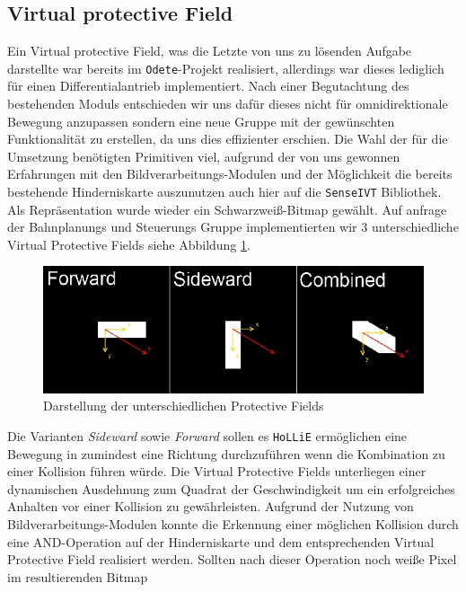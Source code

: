 \subsection{Virtual protective Field}
\label{sec:vpf}
Ein Virtual protective Field, was die Letzte von uns zu lösenden Aufgabe darstellte war bereits im \lstinline{Odete}-Projekt
 realisiert, allerdings war dieses lediglich für einen Differentialantrieb implementiert.
 Nach einer Begutachtung des bestehenden Moduls entschieden wir uns dafür
 dieses nicht für omnidirektionale Bewegung anzupassen sondern eine neue Gruppe mit der gewünschten Funktionalität
 zu erstellen, da uns dies effizienter erschien. Die Wahl der für die Umsetzung benötigten Primitiven viel, aufgrund
 der von uns gewonnen Erfahrungen mit den Bildverarbeitungs-Modulen und der Möglichkeit die bereits bestehende
 Hinderniskarte auszunutzen auch hier auf die \lstinline{SenseIVT}  Bibliothek.
 Als Repräsentation wurde wieder ein Schwarzweiß-Bitmap gewählt. Auf anfrage der Bahnplanungs und Steuerungs
 Gruppe implementierten wir 3 unterschiedliche Virtual Protective Fields siehe
 Abbildung \ref{fig:virtualprotectivefields}.
 \begin{figure}[h]
\center
\includegraphics[scale=0.5]{graphics/virtualprotectivefields.jpg}
\caption{\label{fig:virtualprotectivefields} Darstellung der unterschiedlichen Protective
Fields}
\end{figure}
 Die Varianten \emph{Sideward} sowie \emph{Forward} sollen es \lstinline{HoLLiE}
 ermöglichen eine Bewegung in zumindest eine Richtung durchzuführen wenn die Kombination zu einer Kollision führen würde.
 Die Virtual Protective Fields unterliegen einer dynamischen Ausdehnung zum Quadrat der Geschwindigkeit
 um ein erfolgreiches Anhalten vor einer Kollision zu gewährleisten. Aufgrund der Nutzung von Bildverarbeitungs-Modulen
 konnte die Erkennung einer möglichen Kollision durch eine AND-Operation auf der Hinderniskarte und dem entsprechenden
 Virtual Protective Field realisiert werden. Sollten nach dieser Operation noch weiße Pixel im resultierenden Bitmap

